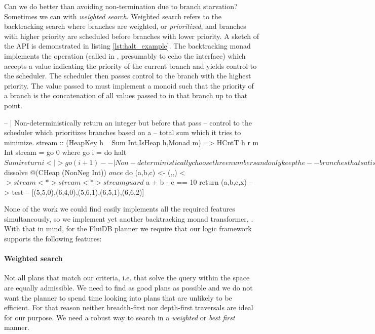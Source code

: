 Can we do better than avoiding non-termination due to branch starvation?
Sometimes we can with \emph{weighted search}. Weighted search refers
to the backtracking search where branches are weighted, or
\emph{prioritized}, and branches with higher priority are scheduled
before branches with lower priority. A sketch of the API is
demonstrated in listing \ref{lst:halt_example}. The backtracking monad
implements the  operation (called  in
\cite{kidneyAlgebrasWeightedSearch2021}, presumably to echo the
 interface) which accepts a value indicating the
priority of the current branch and yields control to the
scheduler. The scheduler then passes control to the branch with the
highest priority. The value passed to  must implement a
monoid such that the priority of a branch is the concatenation of all
values passed to  in that branch up to that point.

\begin{code}
\begin{haskellcode}
  -- | Non-deterministically return an integer but before that pass
  -- control to the scheduler which prioritizes branches based on a
  -- total sum which it tries to minimize.
  stream :: (HeapKey h ~ Sum Int,IsHeap h,Monad m) => HCntT h r m Int
  stream = go 0 where
    go i = do
      halt $ Sum i
      return i <|> go (i+1)

  -- | Non-deterministically choose three numbers and only keep the
  -- branches that satisfy a + b - c == 10. Avoid diverging by prefering
  -- branches for which the sum of the numbers is minimum.
  test2 :: IO [(Int,Int,Int)]
  test2 = takeListT 5 $ dissolve @(CHeap (NonNeg Int)) $ once $ do
    (a,b,c) <- (,,) <$> stream <*> stream <*> stream
    guard $ a + b - c == 10
    return (a,b,c,x)
  -- > test
  -- [(5,5,0),(6,4,0),(5,6,1),(6,5,1),(6,6,2)]
\end{haskellcode}
  \caption{\label{lst:halt_example}Prioritise branches that we want to
    be executed first.}
\end{code}

None of the work we could find easily implements all the required
features simultaneously, so we implement yet another backtracking monad
transformer, . With that in mind, for the FluiDB planner
we require that our logic framework supports the following features:

\paragraph{Weighted search}
Not all plans that match our criteria, i.e. that
solve the query within the space are equally admissible. We need to
find as good plans as possible and we do not want the planner to spend
time looking into plans that are unlikely to be efficient. For that
reason neither breadth-first nor depth-first traversals are ideal for
our purpose. We need a robust way to search in a \emph{weighted} or \emph{best first} manner.


